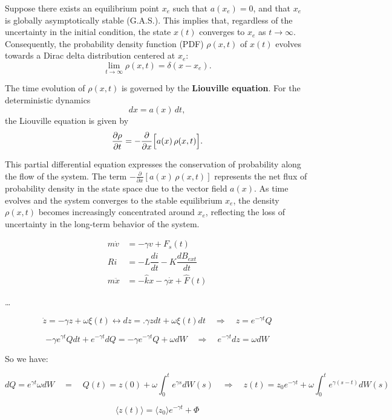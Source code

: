 Suppose there exists an equilibrium point $x_e$ such that $a(x_e)=0$, and that $x_e$ is globally asymptotically stable (G.A.S.). This implies that, regardless of the uncertainty in the initial condition, the state $x(t)$ converges to $x_e$ as $t\to\infty$. Consequently, the probability density function (PDF) $\rho(x,t)$ of $x(t)$ evolves towards a Dirac delta distribution centered at $x_e$:
$$
\lim_{t\to\infty} \rho(x,t) = \delta(x-x_e).
$$

The time evolution of $\rho(x,t)$ is governed by the \textbf{Liouville equation}. For the deterministic dynamics
$$
dx = a(x)\,dt,
$$
the Liouville equation is given by
$$
\frac{\partial \rho}{\partial t} = - \frac{\partial}{\partial x}\Bigl[a(x)\,\rho(x,t)\Bigr].
$$

This partial differential equation expresses the conservation of probability along the flow of the system. The term $-\frac{\partial}{\partial x}\left[a(x)\,\rho(x,t)\right]$ represents the net flux of probability density in the state space due to the vector field $a(x)$. As time evolves and the system converges to the stable equilibrium $x_e$, the density $\rho(x,t)$ becomes increasingly concentrated around $x_e$, reflecting the loss of uncertainty in the long-term behavior of the system.

\newpage

\begin{align}
    m\dot v &= - \gamma v + F_s(t) \tag{I}\\
    Ri &= -L \dfrac{di}{dt} - K \dfrac{dB_{ext}}{dt} \tag{II}\\
    m \ddot x &= - \hat k x - \gamma \dot x + \hat F(t) \tag{III}
\end{align}

\dots

$$
\dot z = - \gamma z + \omega \xi(t) \leftrightarrow dz = . \gamma z dt + \omega \xi(t) dt \quad \Rightarrow \quad z = e^{- \gamma t} Q
$$

$$
- \gamma e^{\gamma t} Q dt + e^{-\gamma t} dQ = - \gamma e ^ {- \gamma t} Q + \omega dW
\quad \Rightarrow \quad 
e^{-\gamma t}dz = \omega dW
$$

So we have:

$$
dQ = e^{\gamma t} \omega dW \quad = \quad Q(t) = z(0) + \omega \int_{0}^{t} e^{\gamma s} dW(s) 
\quad \Rightarrow \quad
\boxed{
z(t) = z_0 e^{- \gamma t} + \omega \int_0^t e^{\gamma (s-t)} dW(s)
}
$$

$$
\langle z(t) \rangle = \langle z_0 \rangle e^{-\gamma t} + \Phi
$$

